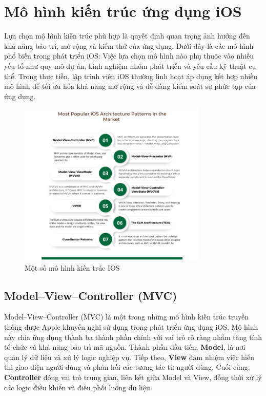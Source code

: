 \section{Mô hình kiến trúc ứng dụng iOS}
Lựa chọn mô hình kiến trúc phù hợp là quyết định quan trọng ảnh hưởng đến khả năng bảo trì, mở rộng và kiểm thử của ứng dụng. Dưới đây là các mô hình phổ biến trong phát triển iOS:
Việc lựa chọn mô hình nào phụ thuộc vào nhiều yếu tố như quy mô dự án, kinh nghiệm nhóm phát triển và yêu cầu kỹ thuật cụ thể. Trong thực tiễn, lập trình viên iOS thường linh hoạt áp dụng kết hợp nhiều mô hình để tối ưu hóa khả năng mở rộng và dễ dàng kiểm soát sự phức tạp của ứng dụng.

\begin{figure}[H] 
    \centering
    \includegraphics[width=0.8\textwidth]{images/mohinhkientrucios.png}
     \caption{Một số mô hình kiến trúc IOS}
    \label{fig:mohinhkientrucios}
\end{figure}
\subsection{Model–View–Controller (MVC)}
  Model–View–Controller (MVC) là một trong những mô hình kiến trúc truyền thống được Apple khuyến nghị sử dụng trong phát triển ứng dụng iOS. Mô hình này chia ứng dụng thành ba thành phần chính với vai trò rõ ràng nhằm tăng tính tổ chức và khả năng bảo trì mã nguồn.
  Thành phần đầu tiên, \textbf{Model}, là nơi quản lý dữ liệu và xử lý logic nghiệp vụ. Tiếp theo, \textbf{View} đảm nhiệm việc hiển thị giao diện người dùng và phản hồi các tương tác từ người dùng. Cuối cùng, \textbf{Controller} đóng vai trò trung gian, liên kết giữa Model và View, đồng thời xử lý các logic điều khiển và điều phối luồng dữ liệu.

